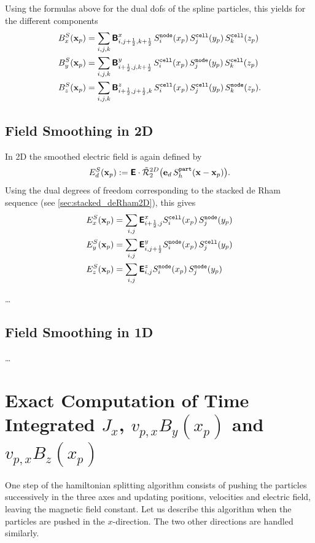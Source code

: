 \documentclass[11pt]{article}
\renewcommand{\part}{\texttt{part}}
\newcommand{\cell}{\texttt{cell}}
\newcommand{\node}{\texttt{node}}
\begin{document}
Using the formulas above for the dual dofs of the spline particles, this yields for the different components
$$
\begin{aligned}
    B^S_x(\mathbf{x}_p) &= \sum_{i,j,k} \arrB^{x}_{i,\jph,\kph} \,S^\node_i(x_p)\,S^\cell_j(y_p) \, S^\cell_k(z_p) \\
    B^S_y(\mathbf{x}_p) &= \sum_{i,j,k} \arrB^{y}_{\iph,j,\kph} \,S^\cell_i(x_p)\,S^\node_j(y_p) \, S^\cell_k(z_p) \\
    B^S_z(\mathbf{x}_p) &= \sum_{i,j,k} \arrB^{z}_{\iph,\jph,k} \,S^\cell_i(x_p)\,S^\cell_j(y_p) \, S^\node_k(z_p). \\
\end{aligned}
$$

\subsection{Field Smoothing in 2D}

In 2D the smoothed electric field is again defined by 
$$
E^S_d(\mathbf{x}_p) := \arrE \cdot \tcR^{2D}_2\big(\mathbf{e}_{d} \, S^\part_h(\mathbf{x}-\mathbf{x}_p)\big).
$$
Using the dual degrees of freedom corresponding to the stacked de Rham sequence 
(see \ref{sec:stacked_deRham2D}),
this gives 
$$
\begin{aligned}
    E^S_x(\mathbf{x}_p) &= 
            \sum_{i,j} \arrE^{x}_{\iph,j} S^\cell_i(x_p)\,S^\node_j(y_p) \\
    E^S_y(\mathbf{x}_p) &= 
            \sum_{i,j} \arrE^{y}_{i,\jph} S^\node_i(x_p)\,S^\cell_j(y_p) \\
    E^S_z(\mathbf{x}_p) &= 
            \sum_{i,j} \arrE^{z}_{i,j} S^\node_i(x_p)\,S^\node_j(y_p)\\
\end{aligned}
$$



\dots

\subsection{Field Smoothing in 1D}

\dots



\section{Exact Computation of Time Integrated $J_x$, $v_{p,x}B_y(x_p)$ and $v_{p,x}B_z(x_p)$ }

One step of the hamiltonian splitting algorithm consists of pushing the particles successively in the three axes and updating positions, velocities and electric field, leaving the magnetic field constant.
Let us describe this algorithm when the particles are pushed in the $x$-direction. The two other directions are handled similarly.  
\end{document}
